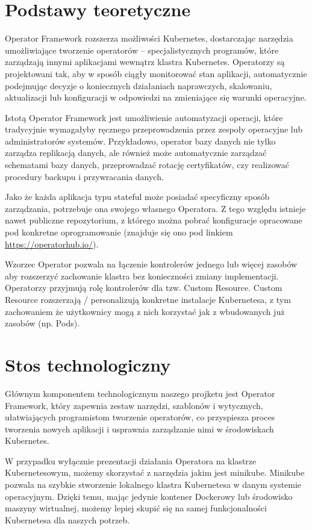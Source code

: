 \documentclass[polish]{aghengthesis}
\begin{document}
\section{Podstawy teoretyczne}

Operator Framework rozszerza możliwości Kubernetes, dostarczając narzędzia umożliwiające tworzenie operatorów – specjalistycznych programów, które zarządzają innymi aplikacjami wewnątrz klastra Kubernetes. Operatorzy są projektowani tak, aby w sposób ciągły monitorować stan aplikacji, automatycznie podejmując decyzje o koniecznych działaniach naprawczych, skalowaniu, aktualizacji lub konfiguracji w odpowiedzi na zmieniające się warunki operacyjne.

Istotą Operator Framework jest umożliwienie automatyzacji operacji, które tradycyjnie wymagałyby ręcznego przeprowadzenia przez zespoły operacyjne lub administratorów systemów. Przykładowo, operator bazy danych nie tylko zarządza replikacją danych, ale również może automatycznie zarządzać schematami bazy danych, przeprowadzać rotację certyfikatów, czy realizować procedury backupu i przywracania danych.

Jako że każda aplikacja typu stateful może posiadać specyficzny sposób zarządzania, potrzebuje ona swojego własnego Operatora. Z tego względu istnieje nawet publiczne repozytorium, z którego można pobrać konfiguracje opracowane pod konkretne oprogramowanie (znajduje się ono pod linkiem \url{https://operatorhub.io/}).

Wzorzec Operator pozwala na łączenie kontrolerów jednego lub więcej zasobów aby rozszerzyć zachowanie klastra bez konieczności zmiany implementacji. Operatorzy przyjmują rolę kontrolerów dla tzw. Custom Resource. Custom Resource rozszerzają / personalizują konkretne instalacje Kubernetesa, z tym zachowaniem że użytkownicy mogą z nich korzystać jak z wbudowanych już zasobów (np. Pods). \cite{operatorpattern}

\section{Stos technologiczny}

Głównym komponentem technologicznym naszego projketu jest Operator Framework, który zapewnia zestaw narzędzi, szablonów i wytycznych, ułatwiających programistom tworzenie operatorów, co przyspiesza proces tworzenia nowych aplikacji i usprawnia zarządzanie nimi w środowiskach Kubernetes.

W przypadku wyłącznie prezentacji działania Operatora na klastrze Kubernetesowym, możemy skorzystać z narzędzia jakim jest minikube. Minikube pozwala na szybkie stworzenie lokalnego klastra Kubernetesa w danym systemie operacyjnym. Dzięki temu, mając jedynie kontener Dockerowy lub środowisko maszyny wirtualnej, możemy lepiej skupić się na samej funkcjonalności Kubernetesa dla naszych potrzeb. \cite{minikube}
\end{document}
